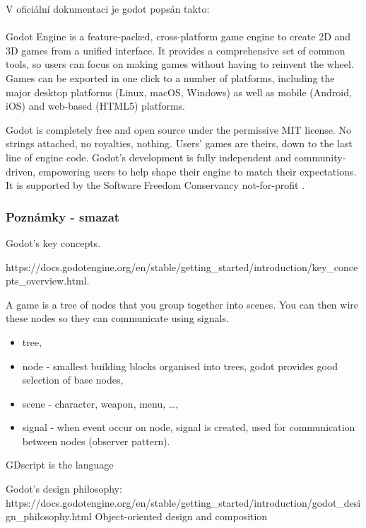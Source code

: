 	V oficiální dokumentaci je godot popsán takto:

		\paragraph{}
		Godot Engine is a feature-packed, cross-platform game engine to create 2D and 3D games from a unified interface. It provides a comprehensive set of common tools, so users can focus on making games without having to reinvent the wheel. Games can be exported in one click to a number of platforms, including the major desktop platforms (Linux, macOS, Windows) as well as mobile (Android, iOS) and web-based (HTML5) platforms.

		Godot is completely free and open source under the permissive MIT license. No strings attached, no royalties, nothing. Users' games are theirs, down to the last line of engine code. Godot's development is fully independent and community-driven, empowering users to help shape their engine to match their expectations. It is supported by the Software Freedom Conservancy not-for-profit \cite{godot_introduction} .

		\subsubsection{Poznámky - smazat}
		Godot's key concepts.

		https://docs.godotengine.org/en/stable/getting\_started/introduction/key\_concepts\_overview.html.

		A game is a tree of nodes that you group together into scenes. You can then wire these nodes so they can communicate using signals.

		\begin{itemize}
			\item tree,
			\item node - smallest building blocks organised into trees, godot provides good selection of base nodes,
			\item scene - character, weapon, menu, \ldots,
			\item  signal - when event occur on node, signal is created, used for communication between nodes (observer pattern).
		\end{itemize}

		GDscript is the language

		Godot's design philosophy:
		https://docs.godotengine.org/en/stable/getting\_started/introduction/godot\_design\_philosophy.html
		Object-oriented design and composition

